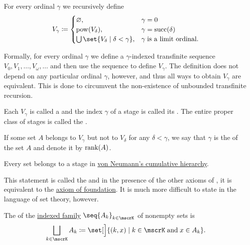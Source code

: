 \begin{definition}\label{def:cumulative_hierarchy}
  For every ordinal \( \gamma \) we recursively define
  \begin{equation*}
    V_\gamma \coloneqq \begin{cases}
      \varnothing,                                    &\gamma = 0 \\
      \pow(V_\delta),                                 &\gamma = \op{succ}(\delta) \\
      \bigcup\set{ V_\delta \given \delta < \gamma }, &\gamma \T{is a limit ordinal.}
    \end{cases}
  \end{equation*}

  Formally, for every ordinal \( \gamma \) we define a \( \gamma \)-indexed transfinite sequence \( V_0, V_1, \ldots, V_\omega, \ldots \) and then use the sequence to define \( V_\gamma \). The definition does not depend on any particular ordinal \( \gamma \), however, and thus all ways to obtain \( V_\gamma \) are equivalent. This is done to circumvent the non-existence of unbounded transfinite recursion.

  Each \( V_\gamma \) is called a  and the index \( \gamma \) of a stage is called its . The entire proper class of stages is called the .

  If some set \( A \) belongs to \( V_\gamma \) but not to \( V_\delta \) for any \( \delta < \gamma \), we say that \( \gamma \) is the  of the set \( A \) and denote it by \( \operatorname{rank}(A) \).
\end{definition}

\begin{theorem}\label{thm:axiom_of_regularity}
  Every set belongs to a stage in \hyperref[def:cumulative_hierarchy]{von Neumann's cumulative hierarchy}.

  This statement is called the  and in the presence of the other axioms of , it is equivalent to the \hyperref[def:zfc/foundation]{axiom of foundation}. It is much more difficult to state in the language of set theory, however.
\end{theorem}

\begin{definition}\label{def:disjoint_union}
  The  of the \hyperref[def:indexed_family]{indexed family} \( \seq{ A_k }_{k \in \mscrK} \) of nonempty sets is
  \begin{equation*}
    \bigsqcup_{k \in \mscrK} A_k \coloneqq \set[\Big]{ (k, x) \given k \in \mscrK \T{and} x \in A_k }.
  \end{equation*}
\end{definition}

